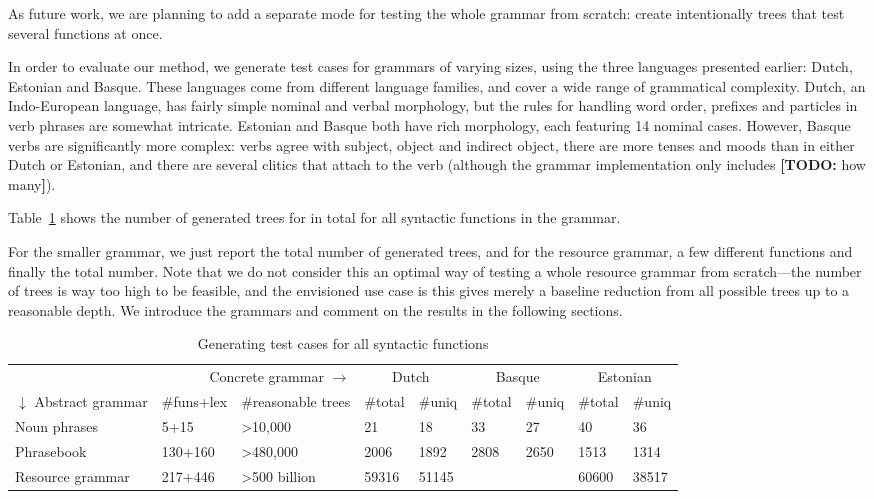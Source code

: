 \documentclass[11pt]{article}
\newcommand{\todo}[1]{{\color{cyan}\textbf{[TODO: }#1\textbf{]}}}
\begin{document}
As future work, we are planning to add a separate mode for testing the
whole grammar from scratch: create intentionally trees that test
several functions at once.

In order to evaluate our method, we generate test cases for grammars
of varying sizes, using the three languages presented earlier: Dutch,
Estonian and Basque. These languages come from different language
families, and cover a wide range of grammatical complexity. Dutch, an
Indo-European language, has fairly simple nominal and verbal
morphology, but the rules for handling word order, prefixes and
particles in verb phrases are somewhat intricate. Estonian and Basque
both have rich morphology, each featuring 14 nominal cases. However, Basque
verbs are significantly more complex: verbs agree with subject, object
and indirect object, there are more tenses and moods than in either
Dutch or Estonian, and there are several clitics that attach to the
verb (although the grammar implementation only includes \todo{how
  many}). 

Table~\ref{results} shows the number of generated trees for 
in total for all syntactic functions in
the grammar. 

For the smaller grammar, we just report the total number of generated
trees, and for the resource grammar, a few different functions and
finally the total number. Note that we do not consider this an optimal way of
testing a whole resource grammar from scratch---the number of trees is
way too high to be feasible, and the envisioned use case is
this gives merely a baseline
reduction from all possible trees up to a reasonable depth.
We introduce the grammars and comment on the results in the following sections.
\begin{table}[]
\centering
\begin{tabular}{|lll|ll|ll|ll|}
\hline
\multicolumn{3}{|r}{Concrete grammar $\rightarrow$}             & \multicolumn{2}{|c}{Dutch} & \multicolumn{2}{|c}{Basque} & \multicolumn{2}{|c|}{Estonian} \\
$\downarrow$ Abstract grammar & \#funs+lex & \#reasonable trees  &
                                                                 \#total     & \#uniq    & \#total     & \#uniq     & \#total      & \#uniq      \\ \hline
Noun phrases     & 5+15          & \textgreater{}10,000          & 21          & 18          & 33          & 27           & 40           & 36            \\
Phrasebook       & 130+160         & \textgreater{}480,000         & 2006        & 1892        & 2808        & 2650         & 1513         & 1314          \\
Resource grammar & 217+446         & \textgreater{}500 billion & 59316       & 51145       &             &              & 60600        & 38517        \\
\hline
\end{tabular}
\caption{Generating test cases for all syntactic functions}
\label{results}
\end{table}
\end{document}
